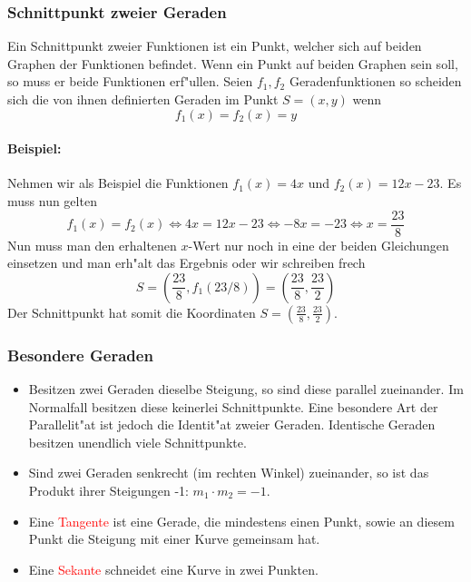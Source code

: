 \subsubsection{Schnittpunkt zweier Geraden}
Ein Schnittpunkt zweier Funktionen ist ein Punkt, welcher sich auf beiden Graphen der Funktionen befindet. Wenn ein Punkt auf beiden Graphen sein soll, so muss er beide Funktionen erf"ullen. Seien $f_1, f_2$ Geradenfunktionen so scheiden sich die von ihnen definierten Geraden im Punkt $S = (x, y)$ wenn
\begin{equation*}
f_1(x) = f_2(x) = y
\end{equation*}

\paragraph{Beispiel:}
Nehmen wir als Beispiel die Funktionen $f_1(x) = 4x$ und $f_2(x) = 12x - 23$. Es muss nun gelten 
\begin{equation*}
	f_1(x) = f_2(x) \iff 4x = 12x - 23 \iff -8x = -23 \iff x = \frac{23}{8}
\end{equation*}
Nun muss man den erhaltenen $x$-Wert nur noch in eine der beiden Gleichungen einsetzen und man erh"alt das Ergebnis oder wir schreiben frech
\begin{equation*}
S = \left( \frac{23}{8}, f_1(23/8) \right) = \left(\frac{23}{8}, \frac{23}{2} \right)
\end{equation*}
Der Schnittpunkt hat somit die Koordinaten $S = \left(\frac{23}{8}, \frac{23}{2} \right)$.

\subsubsection{Besondere Geraden}
\begin{itemize}
\item Besitzen zwei Geraden dieselbe Steigung, so sind diese parallel zueinander. Im Normalfall besitzen diese keinerlei Schnittpunkte. Eine besondere Art der Parallelit"at ist jedoch die Identit"at zweier Geraden. Identische Geraden besitzen unendlich viele Schnittpunkte.
\item Sind zwei Geraden senkrecht (im rechten Winkel) zueinander, so ist das Produkt ihrer Steigungen -1: $m_1 \cdot m_2 = -1$.
\item Eine  \textcolor{red}{Tangente} ist eine Gerade, die mindestens einen Punkt, sowie an diesem Punkt die Steigung mit einer Kurve gemeinsam hat.
\item Eine  \textcolor{red}{Sekante} schneidet eine Kurve in zwei Punkten.
\end{itemize}